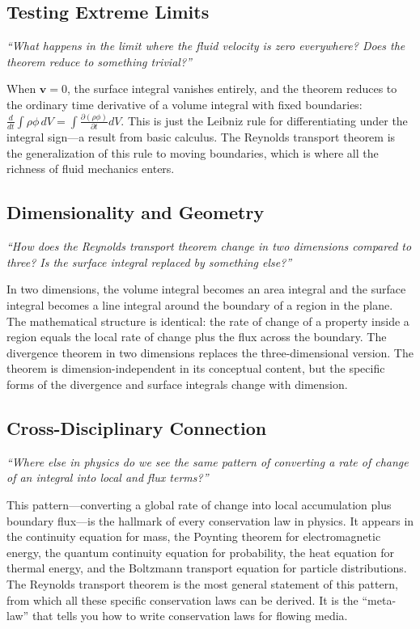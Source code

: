 \documentclass[11pt,openright]{book}
\begin{document}
\subsection*{Testing Extreme Limits}
\textit{``What happens in the limit where the fluid velocity is zero everywhere? Does the theorem reduce to something trivial?''}

When $\mathbf{v} = 0$, the surface integral vanishes entirely, and the theorem reduces to the ordinary time derivative of a volume integral with fixed boundaries: $\frac{d}{dt}\int\rho\phi\,dV = \int\frac{\partial(\rho\phi)}{\partial t}dV$. This is just the Leibniz rule for differentiating under the integral sign---a result from basic calculus. The Reynolds transport theorem is the generalization of this rule to moving boundaries, which is where all the richness of fluid mechanics enters.

\subsection*{Dimensionality and Geometry}
\textit{``How does the Reynolds transport theorem change in two dimensions compared to three? Is the surface integral replaced by something else?''}

In two dimensions, the volume integral becomes an area integral and the surface integral becomes a line integral around the boundary of a region in the plane. The mathematical structure is identical: the rate of change of a property inside a region equals the local rate of change plus the flux across the boundary. The divergence theorem in two dimensions replaces the three-dimensional version. The theorem is dimension-independent in its conceptual content, but the specific forms of the divergence and surface integrals change with dimension.

\subsection*{Cross-Disciplinary Connection}
\textit{``Where else in physics do we see the same pattern of converting a rate of change of an integral into local and flux terms?''}

This pattern---converting a global rate of change into local accumulation plus boundary flux---is the hallmark of every conservation law in physics. It appears in the continuity equation for mass, the Poynting theorem for electromagnetic energy, the quantum continuity equation for probability, the heat equation for thermal energy, and the Boltzmann transport equation for particle distributions. The Reynolds transport theorem is the most general statement of this pattern, from which all these specific conservation laws can be derived. It is the ``meta-law'' that tells you how to write conservation laws for flowing media.
\end{document}
